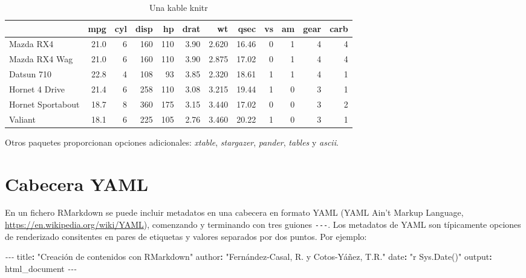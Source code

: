 \documentclass[
]{book}
\newenvironment{Shaded}{\begin{snugshade}}{\end{snugshade}}
\newcommand{\AttributeTok}[1]{\textcolor[rgb]{0.77,0.63,0.00}{#1}}
\newcommand{\FunctionTok}[1]{\textcolor[rgb]{0.00,0.00,0.00}{#1}}
\newcommand{\KeywordTok}[1]{\textcolor[rgb]{0.13,0.29,0.53}{\textbf{#1}}}
\newcommand{\PreprocessorTok}[1]{\textcolor[rgb]{0.56,0.35,0.01}{\textit{#1}}}
\newcommand{\StringTok}[1]{\textcolor[rgb]{0.31,0.60,0.02}{#1}}
\theoremstyle{break}
\theoremstyle{nonumberplain}
\begin{document}
\begin{table}

\caption{\label{tab:kable}Una kable knitr}
\centering
\begin{tabular}[t]{l|r|r|r|r|r|r|r|r|r|r|r}
\hline
  & mpg & cyl & disp & hp & drat & wt & qsec & vs & am & gear & carb\\
\hline
Mazda RX4 & 21.0 & 6 & 160 & 110 & 3.90 & 2.620 & 16.46 & 0 & 1 & 4 & 4\\
\hline
Mazda RX4 Wag & 21.0 & 6 & 160 & 110 & 3.90 & 2.875 & 17.02 & 0 & 1 & 4 & 4\\
\hline
Datsun 710 & 22.8 & 4 & 108 & 93 & 3.85 & 2.320 & 18.61 & 1 & 1 & 4 & 1\\
\hline
Hornet 4 Drive & 21.4 & 6 & 258 & 110 & 3.08 & 3.215 & 19.44 & 1 & 0 & 3 & 1\\
\hline
Hornet Sportabout & 18.7 & 8 & 360 & 175 & 3.15 & 3.440 & 17.02 & 0 & 0 & 3 & 2\\
\hline
Valiant & 18.1 & 6 & 225 & 105 & 2.76 & 3.460 & 20.22 & 1 & 0 & 3 & 1\\
\hline
\end{tabular}
\end{table}

Otros paquetes proporcionan opciones adicionales: \emph{xtable}, \emph{stargazer}, \emph{pander}, \emph{tables} y \emph{ascii}.

\hypertarget{yaml}{%
\section{Cabecera YAML}\label{yaml}}

En un fichero RMarkdown se puede incluir metadatos en una cabecera en formato YAML
(YAML Ain't Markup Language, \url{https://en.wikipedia.org/wiki/YAML}),
comenzando y terminando con tres guiones \texttt{-\/-\/-}.
Los metadatos de YAML son típicamente opciones de renderizado consitentes en
pares de etiquetas y valores separados por dos puntos.
Por ejemplo:

\begin{Shaded}
\begin{Highlighting}[]
\PreprocessorTok{{-}{-}{-}}
\FunctionTok{title}\KeywordTok{:}\AttributeTok{ }\StringTok{"Creación de contenidos con RMarkdown"}
\FunctionTok{author}\KeywordTok{:}\AttributeTok{ }\StringTok{"Fernández{-}Casal, R. y Cotos{-}Yáñez, T.R."}
\FunctionTok{date}\KeywordTok{:}\AttributeTok{ }\StringTok{"\textasciigrave{}r Sys.Date()\textasciigrave{}"}
\FunctionTok{output}\KeywordTok{:}\AttributeTok{ html\_document}
\PreprocessorTok{{-}{-}{-}}
\end{Highlighting}
\end{Shaded}
\end{document}
